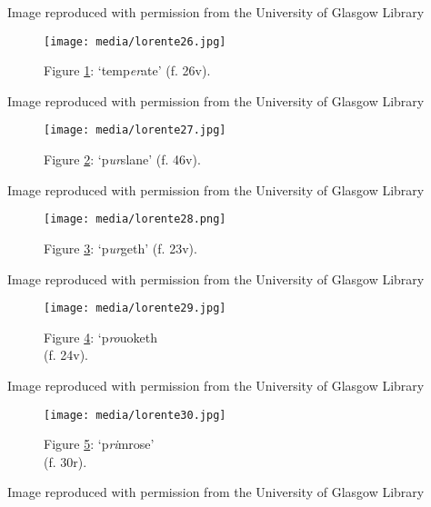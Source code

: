 \documentclass{article}
\begin{document}
 Image reproduced with permission from the University of Glasgow Library 


 
  \begin{figure}
    \texttt{[image: media/lorente26.jpg]}
    \caption{Figure \ref{fig:lorente26}: `temp\emph{er}ate' (f.
26v).\\}
    \label{fig:lorente26}
  \end{figure}


 Image reproduced with permission from the University of Glasgow Library 


 
  \begin{figure}
    \texttt{[image: media/lorente27.jpg]}
    \caption{Figure \ref{fig:lorente27}: `p\emph{ur}slane' (f. 46v).}
    \label{fig:lorente27}
  \end{figure}


 Image reproduced with permission from the University of Glasgow Library 


 
  \begin{figure}
    \texttt{[image: media/lorente28.png]}
    \caption{Figure \ref{fig:lorente28}: `p\emph{ur}geth' (f.
23v).}
    \label{fig:lorente28}
\end{figure}


 Image reproduced with permission from the University of Glasgow Library 


 
\begin{figure}[H]
  \centering
    \texttt{[image: media/lorente29.jpg]}
    \caption{Figure \ref{fig:lorente29}: `p\emph{ro}uoketh \\ (f. 24v).}
    \label{fig:lorente29}
  \end{figure}


 Image reproduced with permission from the University of Glasgow Library 


 
  \begin{figure}
    \texttt{[image: media/lorente30.jpg]}
    \caption{Figure \ref{fig:lorente30}: `p\emph{ri}mrose' \\ (f.
30r).}
    \label{fig:lorente30}
  \end{figure}


 Image reproduced with permission from the University of Glasgow Library 
\end{document}
